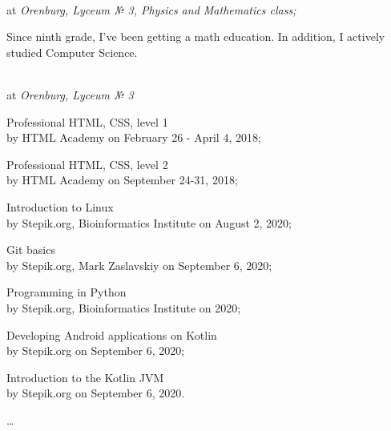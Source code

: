 \SmallSep

 \\
at \textit {Orenburg, Lyceum № 3, Physics and Mathematics class;}
\SmallSep

Since ninth grade, I've been getting a math education. In addition, I actively studied Computer Science.

\SmallSep

 \\
at \textit {Orenburg, Lyceum № 3}

\Sep



\begin{multicols}{2}
	\begin{compactitem}[\color{Cyan}$\circ$]
		\item\footnotesize Professional HTML, CSS, level 1 \\
		by \footnotesize{HTML Academy}
		on \footnotesize{February 26 - April 4, 2018;}
		
		\item\footnotesize Professional HTML, CSS, level 2 \\
		by \footnotesize{HTML Academy}
		on \footnotesize{September 24-31, 2018;}
		
		\item\footnotesize Introduction to Linux \\
		by \footnotesize{Stepik.org, Bioinformatics Institute}
		on \footnotesize{August 2, 2020;}
		
		\item\footnotesize Git basics \\
		by \footnotesize{Stepik.org, Mark Zaslavskiy}
		on \footnotesize{September 6, 2020;}
		\vfill\columnbreak
		
		\item\footnotesize Programming in Python \\
		by \footnotesize{Stepik.org, Bioinformatics Institute}
		on \footnotesize{2020;}
		
		\item\footnotesize Developing Android applications on Kotlin \\
		by \footnotesize{Stepik.org}
		on \footnotesize{September 6, 2020;}
		
		\item\footnotesize Introduction to the Kotlin JVM \\
		by \footnotesize{Stepik.org}
		on \footnotesize{September 6, 2020.}
		
		\item \ldots
		
	\end{compactitem}
\end{multicols}

